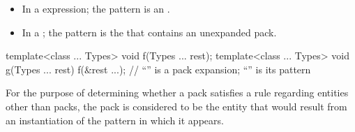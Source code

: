 \documentclass{wg21}
\begin{document}
\begin{itemize}
    \item In a  expression; the pattern is an
    .


    \item In a ;
    the pattern is the 
    that contains an unexpanded pack.
\end{itemize}

\begin{example}
    \begin{codeblock}
        template<class ... Types> void f(Types ... rest);
        template<class ... Types> void g(Types ... rest) {
            f(&rest ...);     // ``'' is a pack expansion; ``'' is its pattern
        }
    \end{codeblock}
\end{example}

\pnum
For the purpose of determining whether a pack satisfies a rule
regarding entities other than packs, the pack is
considered to be the entity that would result from an instantiation of
the pattern in which it appears.
\end{document}
